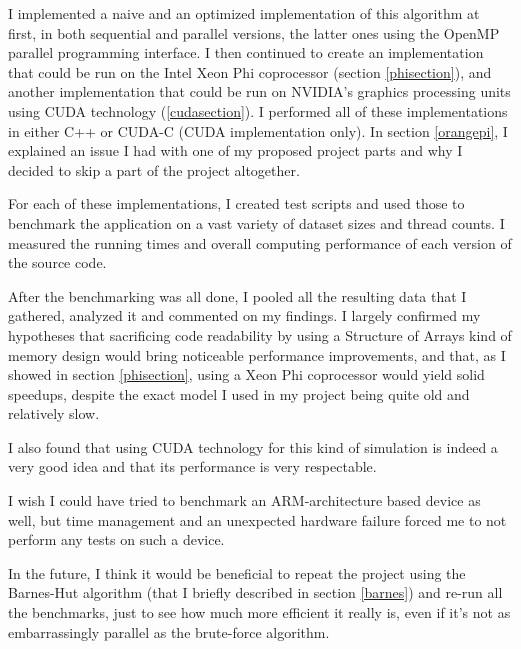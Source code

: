 \documentclass[journal]{IEEEtran}
\begin{document}
		I implemented a naive and an optimized implementation of this algorithm at first, in both sequential and parallel versions, the latter ones using the OpenMP parallel programming interface. I then continued to create an implementation that could be run on the Intel Xeon Phi coprocessor (section \ref{phisection}), and another implementation that could be run on NVIDIA's graphics processing units using CUDA technology (\ref{cudasection}). I performed all of these implementations in either C++ or CUDA-C (CUDA implementation only). In section \ref{orangepi}, I explained an issue I had with one of my proposed project parts and why I decided to skip a part of the project altogether. 
		
		For each of these implementations, I created test scripts and used those to benchmark the application on a vast variety of dataset sizes and thread counts. I measured the running times and overall computing performance of each version of the source code.
		
		After the benchmarking was all done, I pooled all the resulting data that I gathered, analyzed it and commented on my findings. I largely confirmed my hypotheses that sacrificing code readability by using a Structure of Arrays kind of memory design would bring noticeable performance improvements, and that, as I showed in section \ref{phisection}, using a Xeon Phi coprocessor would yield solid speedups, despite the exact model I used in my project being quite old and relatively slow.
		
		I also found that using CUDA technology for this kind of simulation is indeed a very good idea and that its performance is very respectable.
		
		I wish I could have tried to benchmark an ARM-architecture based device as well, but time management and an unexpected hardware failure forced me to not perform any tests on such a device.
		
		In the future, I think it would be beneficial to repeat the project using the Barnes-Hut algorithm (that I briefly described in section \ref{barnes}) and re-run all the benchmarks, just to see how much more efficient it really is, even if it's not as embarrassingly parallel as the brute-force algorithm.
		
	
	
	
\end{document}
